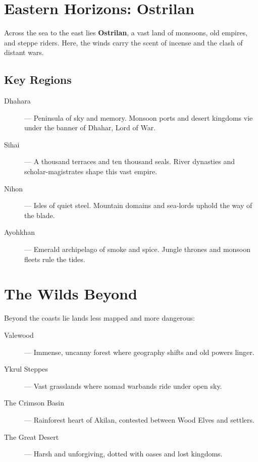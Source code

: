 \section{Eastern Horizons: Ostrilan}

Across the sea to the east lies \textbf{Ostrilan}, a vast land of monsoons, old empires, and steppe riders. Here, the winds carry the scent of incense and the clash of distant wars.

\subsection*{Key Regions}

\begin{description}
  \item[Dhahara]  — Peninsula of sky and memory. Monsoon ports and desert kingdoms vie under the banner of Dhahar, Lord of War.
  \item[Sihai]  — A thousand terraces and ten thousand seals. River dynasties and scholar-magistrates shape this vast empire.
  \item[Nihon]  — Isles of quiet steel. Mountain domains and sea-lords uphold the way of the blade.
  \item[Ayohkhan]  — Emerald archipelago of smoke and spice. Jungle thrones and monsoon fleets rule the tides.
\end{description}

\section{The Wilds Beyond}

Beyond the coasts lie lands less mapped and more dangerous:

\begin{description}
  \item[Valewood]  — Immense, uncanny forest where geography shifts and old powers linger.
  \item[Ykrul Steppes]  — Vast grasslands where nomad warbands ride under open sky.
  \item[The Crimson Basin]  — Rainforest heart of Akilan, contested between Wood Elves and settlers.
  \item[The Great Desert]  — Harsh and unforgiving, dotted with oases and lost kingdoms.
\end{description}

